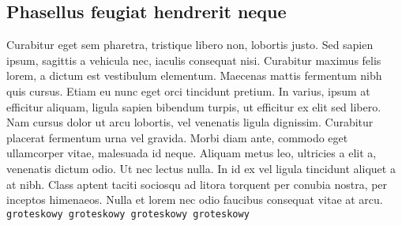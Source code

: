 \documentclass[12pt,a4paper]{article}
\begin{document}
\subsection{Phasellus feugiat hendrerit neque}
Curabitur eget sem pharetra, tristique libero non, lobortis justo. Sed sapien ipsum, sagittis a vehicula nec, iaculis consequat nisi. Curabitur maximus felis lorem, a dictum est vestibulum elementum. Maecenas mattis fermentum nibh quis cursus. Etiam eu nunc eget orci tincidunt pretium. In varius, ipsum at efficitur aliquam, ligula sapien bibendum turpis, ut efficitur ex elit sed libero. Nam cursus dolor ut arcu lobortis, vel venenatis ligula dignissim. Curabitur placerat fermentum urna vel gravida. Morbi diam ante, commodo eget ullamcorper vitae, malesuada id neque. Aliquam metus leo, ultricies a elit a, venenatis dictum odio. Ut nec lectus nulla. In id ex vel ligula tincidunt aliquet a at nibh. Class aptent taciti sociosqu ad litora torquent per conubia nostra, per inceptos himenaeos. Nulla et lorem nec odio faucibus consequat vitae at arcu. \texttt{groteskowy groteskowy groteskowy groteskowy }



\end{document}
